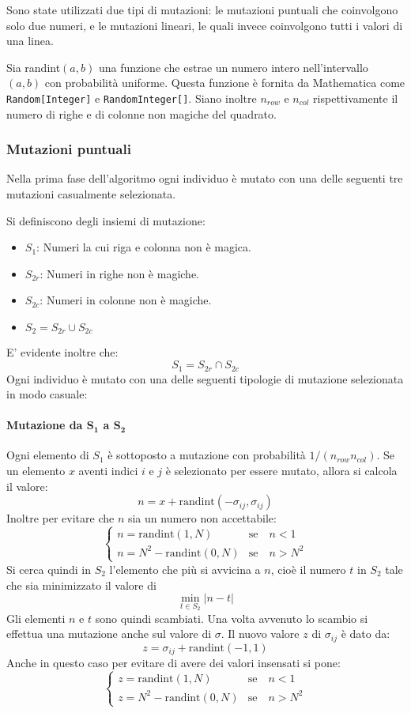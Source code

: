 \documentclass[italian,twoside,twocolumn]{article}
\begin{document}
Sono state utilizzati due tipi di mutazioni: le mutazioni puntuali che coinvolgono solo due numeri, e le mutazioni lineari, le quali invece coinvolgono tutti i valori di una linea.

Sia randint$ (a,b) $ una funzione che estrae un numero intero nell'intervallo $ (a,b) $ con probabilità uniforme. Questa funzione è fornita da Mathematica come \texttt{Random[Integer]} e \texttt{RandomInteger[]}. Siano inoltre $ n_{row} $ e $ n_{col} $ rispettivamente il numero di righe e di colonne non magiche del quadrato.

\subsubsection{Mutazioni puntuali}
Nella prima fase dell'algoritmo ogni individuo è mutato con una delle seguenti tre mutazioni casualmente selezionata. 

Si definiscono degli insiemi di mutazione:
\begin{itemize}
	\item $ S_1 $:  Numeri la cui riga e colonna non è magica.
	\item $ S_{2r} $: Numeri in righe non è magiche.
	\item $ S_{2c} $: Numeri in colonne non è magiche.
	\item $ S_{2} = S_{2r} \cup S_{2c} $
\end{itemize}
E' evidente inoltre che:
\[S_1 = S_{2r} \cap S_{2c} \]
Ogni individuo è mutato con una delle seguenti tipologie di mutazione selezionata in modo casuale:

\paragraph{Mutazione da $ \mathbf{S_1} $ a $ \mathbf{S_2} $}
Ogni elemento di $ S_1 $ è sottoposto a mutazione con probabilità $ 1\slash(n_{row}n_{col}) $. Se un elemento $ x $ aventi indici $ i $ e $ j $ è selezionato per essere mutato, allora si calcola il valore:
\[ n = 	x + \text{randint}(-\sigma_{ij}, \sigma_{ij})  \]
Inoltre per evitare che $ n $ sia un numero non accettabile:
\[
\begin{cases}
n = \text{randint}(1,N) & \text{se} \quad n < 1  \\
n = N^2 - \text{randint}(0,N) & \text{se} \quad n > N^2  
\end{cases}
\]
Si cerca quindi in $ S_2 $ l'elemento che più si avvicina a $ n $, cioè il numero $ t $ in $ S_2 $ tale che sia minimizzato il valore di 
\[\min_{t \in S_2} \lvert n - t \rvert \]
Gli elementi $ n $ e $ t $ sono quindi scambiati. Una volta avvenuto lo scambio si effettua una mutazione anche sul valore di $ \sigma $.
Il nuovo valore $ z $ di $ \sigma_{ij} $ è dato da: 
\[ z = 	\sigma_{ij} + \text{randint}(-1, 1)  \]
Anche in questo caso per evitare di avere dei valori insensati si pone:
\[
\begin{cases}
z = \text{randint}(1,N) & \text{se} \quad n < 1  \\
z = N^2 - \text{randint}(0,N) & \text{se} \quad n > N^2  
\end{cases}
\]
\end{document}
